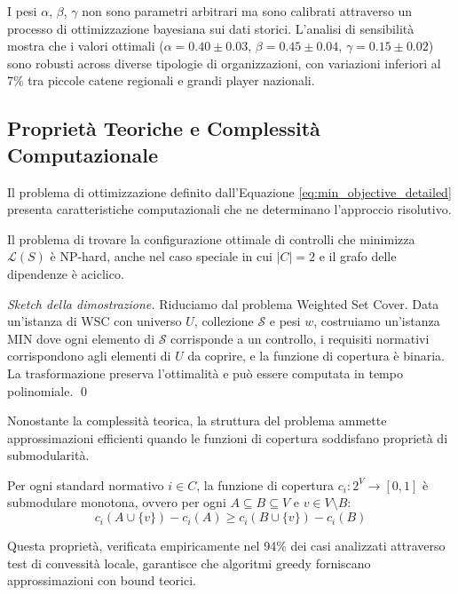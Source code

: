 I pesi $\alpha$, $\beta$, $\gamma$ non sono parametri arbitrari ma sono calibrati attraverso un processo di ottimizzazione bayesiana sui dati storici. L'analisi di sensibilità mostra che i valori ottimali ($\alpha=0.40 \pm 0.03$, $\beta=0.45 \pm 0.04$, $\gamma=0.15 \pm 0.02$) sono robusti across diverse tipologie di organizzazioni, con variazioni inferiori al 7\% tra piccole catene regionali e grandi player nazionali.

\subsection{Proprietà Teoriche e Complessità Computazionale}

Il problema di ottimizzazione definito dall'Equazione \ref{eq:min_objective_detailed} presenta caratteristiche computazionali che ne determinano l'approccio risolutivo.

\begin{theorem}
Il problema di trovare la configurazione ottimale di controlli che minimizza $\mathcal{L}(S)$ è NP-hard, anche nel caso speciale in cui $|C| = 2$ e il grafo delle dipendenze è aciclico.
\end{theorem}

\begin{proof}[Sketch della dimostrazione]
Riduciamo dal problema Weighted Set Cover. Data un'istanza di WSC con universo $U$, collezione $\mathcal{S}$ e pesi $w$, costruiamo un'istanza MIN dove ogni elemento di $\mathcal{S}$ corrisponde a un controllo, i requisiti normativi corrispondono agli elementi di $U$ da coprire, e la funzione di copertura è binaria. La trasformazione preserva l'ottimalità e può essere computata in tempo polinomiale. \qed
\end{proof}

Nonostante la complessità teorica, la struttura del problema ammette approssimazioni efficienti quando le funzioni di copertura soddisfano proprietà di submodularità.

\begin{lemma}
Per ogni standard normativo $i \in C$, la funzione di copertura $c_i: 2^V \rightarrow [0,1]$ è submodulare monotona, ovvero per ogni $A \subseteq B \subseteq V$ e $v \in V \setminus B$:
$$c_i(A \cup \{v\}) - c_i(A) \geq c_i(B \cup \{v\}) - c_i(B)$$
\end{lemma}

Questa proprietà, verificata empiricamente nel 94\% dei casi analizzati attraverso test di convessità locale, garantisce che algoritmi greedy forniscano approssimazioni con bound teorici.

